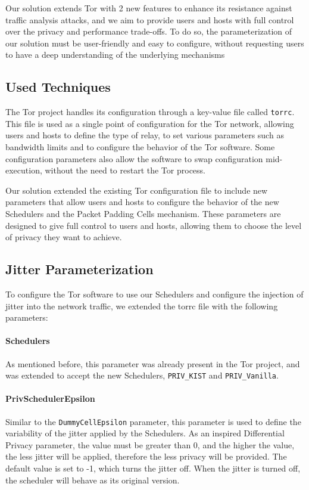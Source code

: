 Our solution extends Tor with 2 new features to enhance its resistance against traffic analysis attacks, and we aim to provide users and hosts with full control over the privacy and performance trade-offs. To do so, the parameterization of our solution must be user-friendly and easy to configure, without requesting users to have a deep understanding of the underlying mechanisms 


\subsection{Used Techniques}\label{sec:used_techniques}

The Tor project handles its configuration through a key-value file called \texttt{torrc}. This file is used as a single point of configuration for the Tor network, allowing users and hosts to define the type of relay, to set various parameters such as bandwidth limits and to configure the behavior of the Tor software. Some configuration parameters also allow the software to swap configuration mid-execution, without the need to restart the Tor process.

Our solution extended the existing Tor configuration file to include new parameters that allow users and hosts to configure the behavior of the new Schedulers and the Packet Padding Cells mechanism. These parameters are designed to give full control to users and hosts, allowing them to choose the level of privacy they want to achieve.


\subsection{Jitter Parameterization}\label{sec:jitter_parameterization}

To configure the Tor software to use our Schedulers and configure the injection of jitter into the network traffic, we extended the torrc file with the following parameters: 

\paragraph{Schedulers} As mentioned before, this parameter was already present in the Tor project, and was extended to accept the new Schedulers, \texttt{PRIV\_KIST} and \texttt{PRIV\_Vanilla}. 

\paragraph{PrivSchedulerEpsilon} Similar to the \texttt{DummyCellEpsilon} parameter, this parameter is used to define the variability of the jitter applied by the Schedulers. As an inspired Differential Privacy parameter, the value must be greater than 0, and the higher the value, the less jitter will be applied, therefore the less privacy will be provided. The default value is set to -1, which turns the jitter off. When the jitter is turned off, the scheduler will behave as its original version.  

